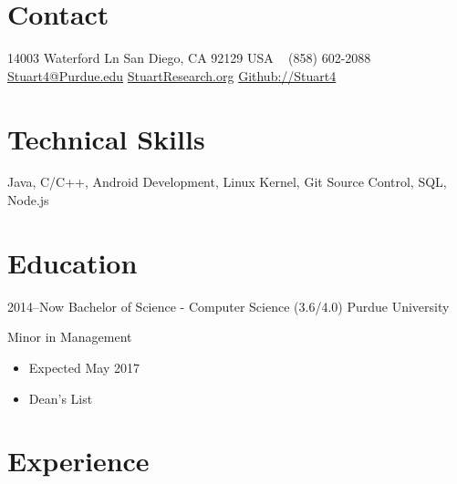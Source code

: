 \documentclass[print]{friggeri-cv} %
\begin{document}


\begin{aside} %
\section{Contact}
14003 Waterford Ln
San Diego, CA 92129
USA
~
(858) 602-2088
~
\href{mailto:stuart4@purdue.edu}{Stuart4@Purdue.edu}
\href{http://stuartresearch.org}{StuartResearch.org}
\href{https://www.github.com/Stuart4}{Github://Stuart4}
~
\section{Technical Skills}
Java, C/C++,
Android Development,
Linux Kernel,
Git Source Control,
SQL, Node.js
\end{aside}


\section{Education}

\begin{entrylist}


\entry
{2014--Now}
{Bachelor of Science - Computer Science {\normalfont (3.6/4.0)}}
{Purdue University}
{Minor in Management
	\begin{itemize}
	\item Expected May 2017
	\item Dean's List
	\end{itemize}}


\end{entrylist}

\section{Experience}
\end{document}
